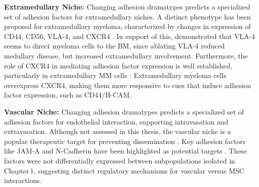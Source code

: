 \textbf{Extramedullary Niche:}
Changing adhesion dramatypes predicts a specialized set of adhesion factors for
extramedullary niches. A distinct phenotype has been proposed for extramedullary
myeloma, characterized by changes in
expression of CD44, CD56, VLA-4, and CXCR4
\cite{guptaExtramedullaryMultipleMyeloma2022}. In support of this,
\cite{hathiAblationVLA4Multiple2022} demonstrated that VLA-4 seems to direct
myeloma cells to the BM, since ablating VLA-4 reduced medullary disease, but
increased extramedullary involvement. Furthermore, the role of CXCR4 in
mediating adhesion factor expression is well established, particularly in
extramedullary MM cells \cite{roccaroCXCR4RegulatesExtraMedullary2015,
      guptaExtramedullaryMultipleMyeloma2022}: Extramedullary myeloma cells
overexpress CXCR4, making them more responsive to cues that induce adhesion
factor expression, such as CD44/H-CAM.



\textbf{Vascular Niche:}
Changing adhesion dramatypes predicts a specialized set of adhesion factors for
endothelial interaction, supporting intravasation and extravasation. Although
not assessed in this thesis, the vascular niche is a popular therapeutic target
for preventing dissemination \cite{neriTargetingAdhesionMolecules2012}. Key
adhesion factors like JAM-A and N-Cadherin have been highlighted as potential
targets \cite{solimandoHaltingViciousCycle2020,
      mrozikTherapeuticTargetingNcadherin2015}. These factors were not differentially
expressed between subpopulations isolated in Chapter\,1, suggesting distinct
regulatory mechanisms for vascular versus \ac{MSC} interactions.


